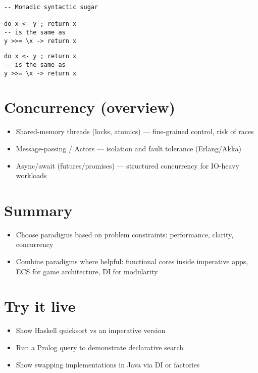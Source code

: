 \documentclass{article}
\begin{document}
\begin{verbatim}
-- Monadic syntactic sugar

do x <- y ; return x
-- is the same as
y >>= \x -> return x 
\end{verbatim}



\begin{verbatim}
do x <- y ; return x
-- is the same as
y >>= \x -> return x 
\end{verbatim}

\pagebreak

\section{Concurrency (overview)}
\begin{itemize}
  \item Shared-memory threads (locks, atomics) — fine-grained control, risk of races
  \item Message-passing / Actors — isolation and fault tolerance (Erlang/Akka)
  \item Async/await (futures/promises) — structured concurrency for IO-heavy workloads
\end{itemize}

\pagebreak

\section{Summary}
\begin{itemize}
  \item Choose paradigms based on problem constraints: performance, clarity, concurrency
  \item Combine paradigms where helpful: functional cores inside imperative apps, ECS for game architecture, DI for modularity
\end{itemize}

\pagebreak

\section*{Try it live}
\begin{itemize}
  \item Show Haskell quicksort vs an imperative version
  \item Run a Prolog query to demonstrate declarative search
  \item Show swapping implementations in Java via DI or factories
\end{itemize}
\end{document}
